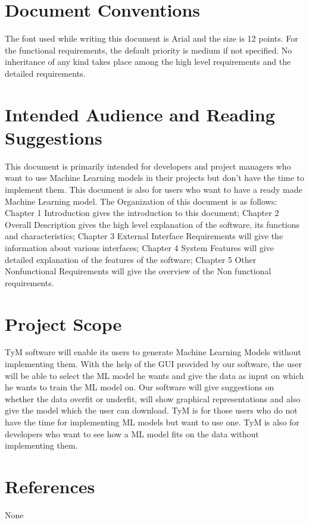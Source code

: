 \documentclass{scrreprt}
\begin{document}
\section{Document Conventions}
The font used while writing this document is Arial and the size is 12 points. For the functional requirements, the default priority is medium if not specified. No inheritance of any kind takes place among the high level requirements and the detailed requirements.

\section{Intended Audience and Reading Suggestions}
This document is primarily intended for developers and project managers who want to use Machine Learning models in their projects but don't have the time to implement them. This document is also for users who want to have a ready made Machine Learning model. The Organization of this document is as follows: Chapter 1 Introduction gives the introduction to this document; Chapter 2 Overall Description gives the high level explanation of the software, its functions and characteristics; Chapter 3 External Interface Requirements will give the information about various interfaces; Chapter 4 System Features will give detailed explanation of the features of the software; Chapter 5 Other Nonfunctional Requirements will give the overview of the Non functional requirements.

\section{Project Scope}
TyM software will enable its users to generate Machine Learning Models without implementing them. With the help of the GUI provided by our software, the user will be able to select the ML model he wants and give the data as input on which he wants to train the ML model on. Our software will give suggestions on whether the data overfit or underfit, will show graphical representations and also give the model which the user can download. TyM is for those users who do not have the time for implementing ML models but want to use one. TyM is also for developers who want to see how a ML model fits on the data without implementing them.

\section{References}
None
\end{document}

